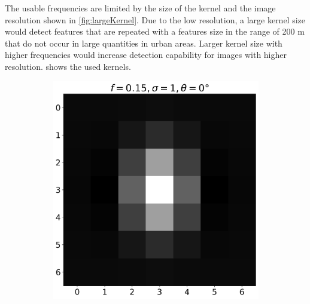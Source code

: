 \documentclass[12pt,a4paper, english]{article}
\begin{document}
    
    The usable frequencies are limited by the size of the kernel and the image resolution shown in \cref{fig:largeKernel}.
    Due to the low resolution, a large kernel size would detect features that are repeated with a features size in the range of 200 m that do not occur in large quantities in urban areas. 
    Larger kernel size with higher frequencies would increase detection capability for images with higher resolution. 
     shows the used kernels.

    \begin{figure}[!htbp]
      \centering
      \begin{subfigure}[b]{0.3\textwidth}
        \includegraphics[width=\textwidth]{img/K0.png}
      \end{subfigure}
      \begin{subfigure}[b]{0.3\textwidth}

\end{subfigure}
\end{figure}
\end{document}
